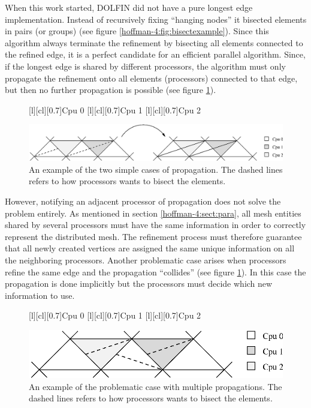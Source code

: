 When this work started, DOLFIN did not have a pure longest edge
implementation. Instead of recursively fixing ``hanging nodes'' it
bisected elements in pairs (or groups) (see figure
\ref{hoffman-4:fig:bisectexample}). Since this algorithm always terminate the
refinement by bisecting all elements connected to the refined edge, it
is a perfect candidate for an efficient parallel algorithm. Since, if the
longest edge is shared by different processors, the algorithm must
only propagate the refinement onto all elements (processors) connected
to that edge, but then no further propagation is possible (see figure
\ref{hoffman-4:fig:prop}).
\begin{figure}[htb]
 [l][cl][0.7]{Cpu 0}
 [l][cl][0.7]{Cpu 1}
 [l][cl][0.7]{Cpu 2}
  \begin{center}
    \includegraphics[width=0.95\columnwidth]{chapters/hoffman-4/eps/prop.eps}
  \end{center}
   \caption{An example of the two simple cases of propagation. The dashed lines refers to how processors wants to bisect the elements.}
   \label{hoffman-4:fig:prop}
\end{figure}

However, notifying an adjacent processor of propagation does not solve
the problem entirely. As mentioned in section \ref{hoffman-4:sect:para}, all
mesh entities shared by several processors must have the same
information in order to correctly represent the distributed mesh. The
refinement process must therefore guarantee that all newly created
vertices are assigned the same unique information on all the
neighboring processors. Another problematic case arises when
processors refine the same edge and the propagation ``collides'' (see
figure \ref{hoffman-4:fig:prop}). In this case the propagation is done
implicitly but the processors must decide which new information
to use.
\begin{figure}[htb]
 [l][cl][0.7]{Cpu 0} [l][cl][0.7]{Cpu 1}
 [l][cl][0.7]{Cpu 2} \begin{center}
 \includegraphics[width=0.65\columnwidth]{chapters/hoffman-4/eps/propprob.eps}
 \end{center} \caption{An example of the problematic case with
 multiple propagations. The dashed lines refers to how processors
 wants to bisect the elements.}  \label{hoffman-4:fig:propprob}
\end{figure}

